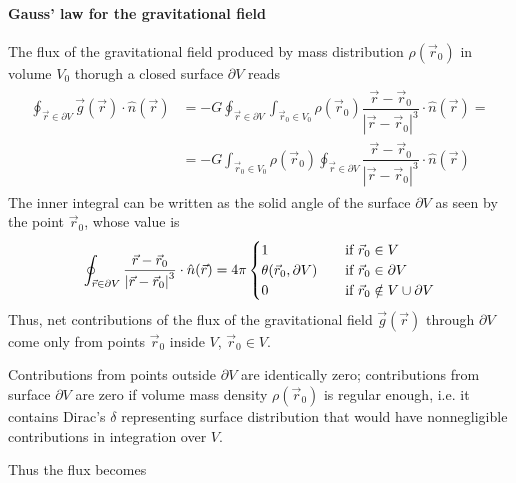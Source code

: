 \documentclass[letterpaper,10pt,english]{jupyterBook}
\begin{document}
\paragraph{Gauss’ law for the gravitational field}
\label{\detokenize{ch/actions-examples:gauss-law-for-the-gravitational-field}}
\sphinxAtStartPar
The flux of the gravitational field produced by mass distribution \(\rho(\vec{r}_0)\) in volume \(V_0\) thorugh a closed surface \(\partial V\) reads
\begin{equation*}
\begin{split}\begin{aligned}
  \oint_{\vec{r} \in \partial V} \vec{g}(\vec{r}) \cdot \hat{n}(\vec{r}) 
  & = - G \oint_{\vec{r} \in \partial V} \int_{\vec{r}_0 \in V_0} \rho(\vec{r}_0) \dfrac{\vec{r} - \vec{r}_0}{\left|\vec{r} - \vec{r}_0\right|^3}  \cdot \hat{n}(\vec{r}) = \\
  & = - G \int_{\vec{r}_0 \in V_0} \rho(\vec{r}_0) \oint_{\vec{r} \in \partial V} \dfrac{\vec{r} - \vec{r}_0}{\left|\vec{r} - \vec{r}_0\right|^3}  \cdot \hat{n}(\vec{r}) 
\end{aligned}\end{split}
\end{equation*}
\sphinxAtStartPar
The inner integral can be written as the solid angle of the surface \(\partial V\) as seen by the point \(\vec{r}_0\), whose value is
\begin{equation*}
\begin{split}
  \oint_{\vec{r} \in \partial V} \dfrac{\vec{r} - \vec{r}_0}{\left|\vec{r} - \vec{r}_0\right|^3}  \cdot \hat{n}(\vec{r}) = 4 \pi
  \begin{cases}
     1 & \quad \text{if $ \vec{r}_0 \in V$} \\
     \theta(\vec{r}_0, \partial V) & \quad \text{if $ \vec{r}_0 \in \partial V$} \\
     0 & \quad \text{if $ \vec{r}_0 \notin V \cup \partial V$} \\
  \end{cases}
\end{split}
\end{equation*}
\sphinxAtStartPar
Thus, net contributions of the flux of the gravitational field \(\vec{g}(\vec{r})\) through \(\partial V\) come only from points \(\vec{r}_0\) inside \(V\), \(\vec{r}_0 \in V\).%
\begin{footnote}[1]\sphinxAtStartFootnote
Contributions from points outside \(\partial V\) are identically zero; contributions from surface \(\partial V\) are zero if volume mass density \(\rho(\vec{r}_0)\) is regular enough, i.e. it contains Dirac’s \(\delta\) representing surface distribution that would have non\sphinxhyphen{}negligible contributions in integration over \(V\).
%
\end{footnote} Thus the flux becomes
\end{document}
